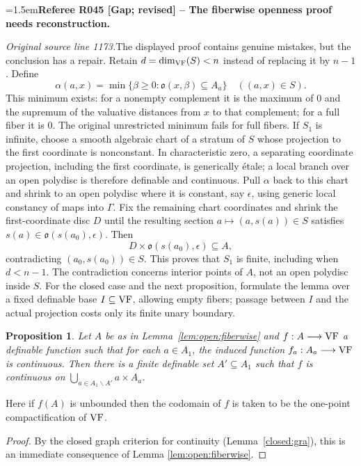 \documentclass[12pt]{amsart}
\newcommand{\RefereeRemark}[4]{%
  \par\medskip\begingroup\normalfont\small\color{RefereePurple}%
  \emergencystretch=1.5em\noindent\textbf{Referee R#1 [#2] -- #3.}\par\nobreak\noindent #4\par
  \endgroup\medskip
}
\theoremstyle{plain}
\newtheorem{prop}[thm]{Proposition}
\theoremstyle{definition}
\theoremstyle{remark}
\numberwithin{equation}{section}
\theoremstyle{plain}
\newcommand{\VF}{\textup{VF}}
\newcommand{\go}{\mathfrak{o}}
\newcommand{\0}{\emptyset}
\newcommand{\fun}{\longrightarrow}
\newcommand{\sub}{\subseteq}
\newcommand{\mi}{\smallsetminus}
\begin{document}
\RefereeRemark{045}{Gap; revised}{The fiberwise openness proof needs reconstruction}{%
\textit{Original source line 1173.}\quad The displayed proof contains genuine mistakes, but the conclusion has a repair. Retain $d=\dim_{\VF}(S)<n$ instead of replacing it by $n-1$. Define
\[
 \alpha(a,x)=\min\{\beta\geq0:\go(x,\beta)\subseteq A_a\}\quad ((a,x)\in S).
\]
This minimum exists: for a nonempty complement it is the maximum of $0$ and the supremum of the valuative distances from $x$ to that complement; for a full fiber it is $0$. The original unrestricted minimum fails for full fibers. If $S_1$ is infinite, choose a smooth algebraic chart of a stratum of $S$ whose projection to the first coordinate is nonconstant. In characteristic zero, a separating coordinate projection, including the first coordinate, is generically \'etale; a local branch over an open polydisc is therefore definable and continuous. Pull $\alpha$ back to this chart and shrink to an open polydisc where it is constant, say $\epsilon$, using generic local constancy of maps into $\Gamma$. Fix the remaining chart coordinates and shrink the first-coordinate disc $D$ until the resulting section $a\mapsto(a,s(a))\in S$ satisfies $s(a)\in\go(s(a_0),\epsilon)$. Then
\[
 D\times\go(s(a_0),\epsilon)\subseteq A,
\]
contradicting $(a_0,s(a_0))\in S$. This proves that $S_1$ is finite, including when $d<n-1$. The contradiction concerns interior points of $A$, not an open polydisc inside $S$. For the closed case and the next proposition, formulate the lemma over a fixed definable base $I\subseteq\VF$, allowing empty fibers; passage between $I$ and the actual projection costs only its finite unary boundary.
}



\begin{prop}\label{prop:continuity:fiberwise}
Let $A$ be as in Lemma~\ref{lem:open:fiberwise} and $f : A \fun \VF$  a definable function such that
for each $a \in A_1$, the induced function $f_a : A_a \fun \VF$ is continuous.
Then there is a finite definable set $A' \sub A_1$ such that $f$ is continuous on
$\bigcup_{a\in A_1 \mi A'} a \times A_a$.
\end{prop}

Here if $f(A)$ is unbounded then the codomain of $f$ is taken to be the one-point compactification of $\VF$.

\begin{proof}
By the  closed graph criterion for continuity (Lemma~\ref{closed:gra}), this is an immediate consequence  of    Lemma \ref{lem:open:fiberwise}.
\end{proof}
\end{document}
